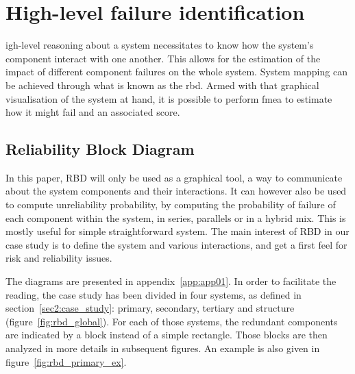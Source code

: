 %
%
\let\textcircled=\pgftextcircled
\chapter{High-level failure identification}
\label{chap:rbd_fmea}


igh-level reasoning about a system necessitates to know how the system's component interact with one another. This allows for the estimation of the impact of different component failures on the whole system. System mapping can be achieved through what is known as the \gls{rbd}. Armed with that graphical visualisation of the system at hand, it is possible to perform \gls{fmea} to estimate how it might fail and an associated score.

\section{Reliability Block Diagram}
\label{sec:rbd}

In this paper, RBD will only be used as a graphical tool, a way to communicate about the system components and their interactions. It can however also be used to compute unreliability probability, by computing the probability of failure of each component within the system, in series, parallels or in a hybrid mix. This is mostly useful for simple straightforward system. The main interest of RBD in our case study is to define the system and various interactions, and get a first feel for risk and reliability issues.

The diagrams are presented in appendix~\ref{app:app01}. In order to facilitate the reading, the case study has been divided in four systems, as defined in section~\ref{sec2:case_study}: primary, secondary, tertiary and structure (figure~\ref{fig:rbd_global}). For each of those systems, the redundant components are indicated by a block instead of a simple rectangle. Those blocks are then analyzed in more details in subsequent figures. An example is also given in figure~\ref{fig:rbd_primary_ex}.

